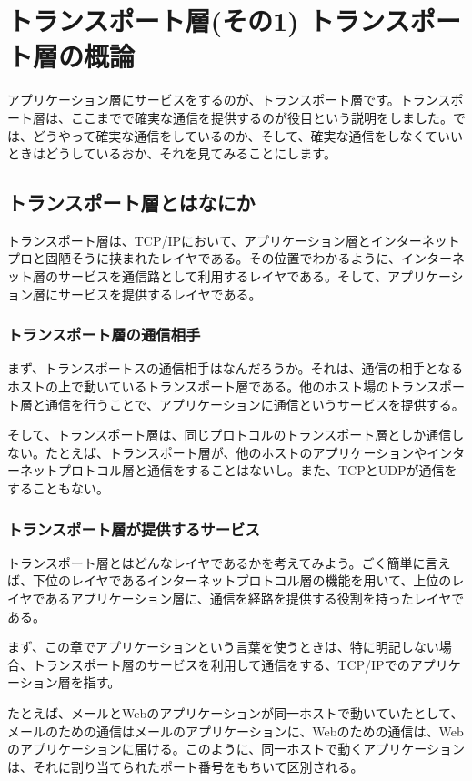 \chapter{トランスポート層(その1) トランスポート層の概論}

アプリケーション層にサービスをするのが、トランスポート層です。トランスポート層は、ここまでで確実な通信を提供するのが役目という説明をしました。では、どうやって確実な通信をしているのか、そして、確実な通信をしなくていいときはどうしているおか、それを見てみることにします。

\section{トランスポート層とはなにか}

トランスポート層は、TCP/IPにおいて、アプリケーション層とインターネットプロと固陋そうに挟まれたレイヤである。その位置でわかるように、インターネット層のサービスを通信路として利用するレイヤである。そして、アプリケーション層にサービスを提供するレイヤである。

\subsection{トランスポート層の通信相手}
まず、トランスポートスの通信相手はなんだろうか。それは、通信の相手となるホストの上で動いているトランスポート層である。他のホスト場のトランスポート層と通信を行うことで、アプリケーションに通信というサービスを提供する。

そして、トランスポート層は、同じプロトコルのトランスポート層としか通信しない。たとえば、トランスポート層が、他のホストのアプリケーションやインターネットプロトコル層と通信をすることはないし。また、TCPとUDPが通信をすることもない。

\subsection{トランスポート層が提供するサービス}

トランスポート層とはどんなレイヤであるかを考えてみよう。ごく簡単に言えば、下位のレイヤであるインターネットプロトコル層の機能を用いて、上位のレイヤであるアプリケーション層に、通信を経路を提供する役割を持ったレイヤである。

まず、この章でアプリケーションという言葉を使うときは、特に明記しない場合、トランスポート層のサービスを利用して通信をする、TCP/IPでのアプリケーション層を指す。

たとえば、メールとWebのアプリケーションが同一ホストで動いていたとして、メールのための通信はメールのアプリケーションに、Webのための通信は、Webのアプリケーションに届ける。このように、同一ホストで動くアプリケーションは、それに割り当てられたポート番号をもちいて区別される。

